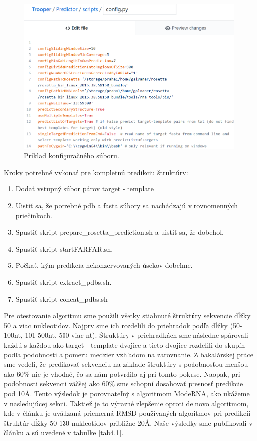 \begin{figure}%
\includegraphics[width=\textwidth]{../img/config}
\caption{Príklad konfiguračného súboru.}
\label{obr04:config}
\end{figure}


\indent Kroky potrebné vykonať pre kompletnú predikciu štruktúry:
\begin{enumerate}
\item Dodať vstupný súbor párov target - template
\item Uistiť sa, že potrebné pdb a fasta súbory sa nachádzajú v rovnomenných priečinkoch.
\item Spustiť skript prepare\_rosetta\_prediction.sh a uistiť sa, že dobehol.
\item Spustiť skript startFARFAR.sh.
\item Počkať, kým predikcia nekonzervovaných úsekov dobehne.
\item Spustiť skript extract\_pdbs.sh.
\item Spustiť skript concat\_pdbs.sh
\end{enumerate}

\indent Pre otestovanie algoritmu sme použili všetky stiahnuté štruktúry sekvencie dĺžky 50 a viac nukleotidov. Najprv sme ich rozdelili do priehradok podľa dĺžky (50-100nt, 101-500nt, 500-viac nt). Štruktúry v priehradkách sme následne spárovali každú s každou ako target - template dvojice a tieto dvojice rozdelili do skupín podľa podobnosti a pomeru medzier vzhľadom na zarovnanie. Z bakalárskej práce sme vedeli, že predikovať sekvenciu na základe štruktúry s podobnosťou menšou ako 60\% nie je vhodné, čo sa nám potvrdilo aj pri tomto pokuse. Naopak, pri podobnosti sekvencii väčšej ako 60\% sme schopní dosahovať presnosť predikcie pod 10Å. Tento výsledok je porovnateľný s algoritmom ModeRNA, ako ukážeme v nasledujúcej sekcii. Taktiež je to výrazné zlepšenie oproti de novo algoritmom, kde v článku \cite{Zhao2012} je uvádzaná priemerná RMSD používaných algoritmov pri predikcii štruktúr dĺžky 50-130 nukleotidov približne 20Å. Naše výsledky sme publikovali v článku \cite{7822808} a sú uvedené v tabuľke \autoref{tab4.1}. 

